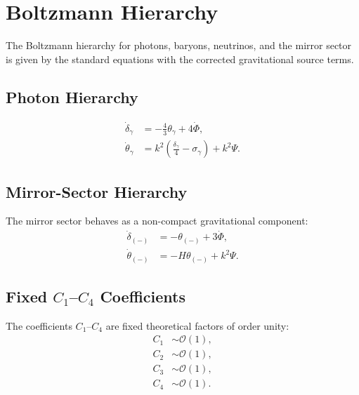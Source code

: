 \documentclass[11pt,a4paper]{article}
\begin{document}

\section[Boltzmann Hierarchy]{Boltzmann Hierarchy}

The Boltzmann hierarchy for photons, baryons, neutrinos, and the mirror sector
is given by the standard equations with the corrected gravitational source
terms.

\subsection[Photon Hierarchy]{Photon Hierarchy}

\begin{align}
\dot{\delta}_{\gamma} &= -\frac{4}{3}\theta_{\gamma} + 4\dot{\Phi}, \\
\dot{\theta}_{\gamma} &= k^2 \left( \frac{\delta_{\gamma}}{4} - \sigma_{\gamma} \right)
+ k^2 \Psi.
\end{align}

\subsection[Mirror-Sector Hierarchy]{Mirror-Sector Hierarchy}

The mirror sector behaves as a non-compact gravitational component:
\begin{align}
\dot{\delta}_{(-)} &= -\theta_{(-)} + 3\dot{\Phi}, \\
\dot{\theta}_{(-)} &= -H\theta_{(-)} + k^2 \Psi.
\end{align}


\subsection[Fixed C coefficients]{Fixed \(C_1\)--\(C_4\) Coefficients}

The coefficients \(C_1\)--\(C_4\) are fixed theoretical factors of order unity:
\begin{align}
C_1 &\sim \mathcal{O}(1), \\
C_2 &\sim \mathcal{O}(1), \\
C_3 &\sim \mathcal{O}(1), \\
C_4 &\sim \mathcal{O}(1).
\end{align}
\end{document}
